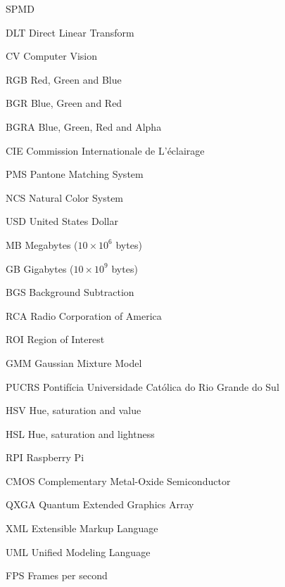 \documentclass[ecp,tc]{iiufrgs}
\begin{document}
\begin{listofabbrv}{SPMD}
        \item[DLT] Direct Linear Transform
        \item[CV] Computer Vision
        \item[RGB] Red, Green and Blue
        \item[BGR] Blue, Green and Red
        \item[BGRA] Blue, Green, Red and Alpha
        \item[CIE] Commission Internationale de L'éclairage
        \item[PMS] Pantone Matching System
        \item[NCS] Natural Color System
        \item[USD] United States Dollar
        \item[MB] Megabytes ($ 10\times10^6 $ bytes)
        \item[GB] Gigabytes ($ 10\times10^9 $ bytes)
        \item[BGS] Background Subtraction
        \item[RCA] Radio Corporation of America
        \item[ROI] Region of Interest
        \item[GMM] Gaussian Mixture Model
        \item[PUCRS] Pontifícia Universidade Católica do Rio Grande do Sul
        \item[HSV] Hue, saturation and value
        \item[HSL] Hue, saturation and lightness
        \item[RPI] Raspberry Pi
        \item[CMOS] Complementary Metal-Oxide Semiconductor
        \item[QXGA] Quantum Extended Graphics Array
        \item[XML] Extensible Markup Language
        \item[UML] Unified Modeling Language
        \item[FPS] Frames per second
    \end{listofabbrv}

\end{document}
